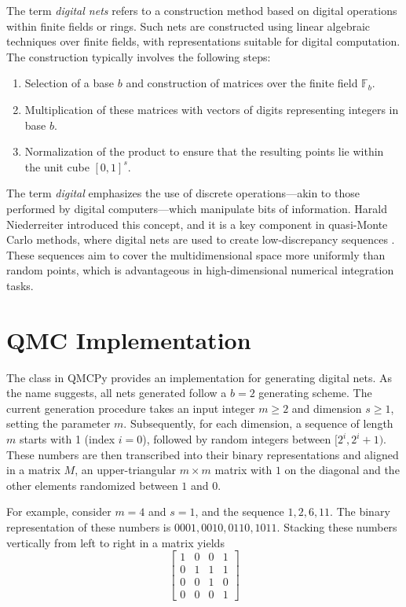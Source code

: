The term \emph{digital nets} refers to a construction method based on digital operations within finite fields or rings. Such nets are constructed using linear algebraic techniques over finite fields, with representations suitable for digital computation. The construction typically involves the following steps:

\begin{enumerate}
    \item Selection of a base \( b \) and construction of matrices over the finite field \( \mathbb{F}_b \).
    \item Multiplication of these matrices with vectors of digits representing integers in base \( b \).
    \item Normalization of the product to ensure that the resulting points lie within the unit cube \( [0,1]^s \).
\end{enumerate}

The term \emph{digital} emphasizes the use of discrete operations—akin to those performed by digital computers—which manipulate bits of information. Harald Niederreiter introduced this concept, and it is a key component in quasi-Monte Carlo methods, where digital nets are used to create low-discrepancy sequences \cite{niederreiter1992RNGQMC}. These sequences aim to cover the multidimensional space more uniformly than random points, which is advantageous in high-dimensional numerical integration tasks.

\section*{QMC Implementation}

The class  in QMCPy provides an implementation for generating digital nets. As the name suggests, all nets generated follow a $b=2$ generating scheme. The current generation procedure takes an input integer $m \ge 2$ and dimension $s \ge 1$, setting the parameter $m$. Subsequently, for each dimension, a sequence of length $m$ starts with 1 (index $i=0$), followed by random integers between $[2^i,2^i+1)$. These numbers are then transcribed into their binary representations and aligned in a matrix $M$, an upper-triangular $m\times m$ matrix with $1$ on the diagonal and the other elements randomized between $1$ and $0$. 

For example, consider $m = 4$ and $s = 1$, and the sequence $1, 2, 6, 11$. The binary representation of these numbers is $0001, 0010,0110,1011$. Stacking these numbers vertically from left to right in a matrix yields
\[
\begin{bmatrix}
1 & 0 & 0 & 1\\
0 & 1 & 1 & 1\\
0 & 0 & 1 & 0\\
0 & 0 & 0 & 1
\end{bmatrix}	
\]





